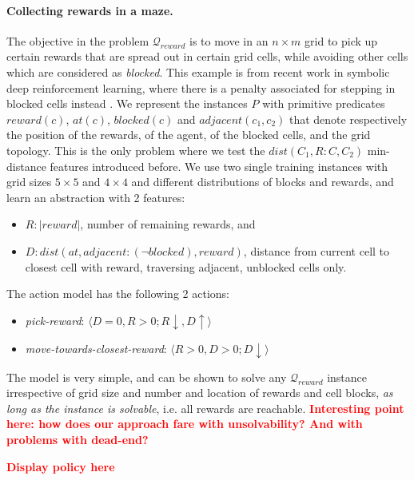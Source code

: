 \documentclass[letterpaper]{article} %
\newcommand{\tuple}[1]{\ensuremath{\langle #1 \rangle}}
\newcommand{\abs}[1]{\ensuremath{\left\vert{#1}\right\vert}}
\newcommand{\alert}[1]{\textcolor{red}{\bf #1}}
\newcommand{\Q}{\mathcal{Q}}
\begin{document}
\paragraph{Collecting rewards in a maze.}
The objective in the problem $\Q_{reward}$ is to move in an $n \times m$ grid to pick up certain
rewards that are spread out in certain grid cells, while avoiding other cells which are considered as \emph{blocked}.
This example is from recent work in symbolic deep
reinforcement learning, where there is a penalty associated for
stepping in blocked cells instead \cite{garnelo2016towards}.
%
We represent the instances $P$ with primitive predicates $reward(c)$, $at(c)$, $blocked(c)$ and $adjacent(c_1, c_2)$ that denote
respectively the position of the rewards, of the agent, of the blocked cells, and the grid topology.
This is the only problem where we test the $\textit{dist}(C_1,R:C,C_2)$ min-distance features introduced before.
We use two single training instances with grid sizes $5 \times 5$ and $4 \times 4$ and different distributions of blocks and rewards,
and learn an abstraction with 2 features:

\begin{itemize}
\item $R: \abs{reward}$, number of remaining rewards, and
\item $D: dist(at, adjacent:(\neg blocked), reward)$, distance from current cell to closest cell with reward, traversing adjacent, unblocked cells only.
\end{itemize}

\noindent The action model has the following 2 actions:

\begin{itemize}
\item \emph{pick-reward}: \hspace*{\fill} \tuple{D=0, R > 0;  R \downarrow, D \uparrow}
\item \emph{move-towards-closest-reward}: \hspace*{\fill} \tuple{R>0, D>0; D \downarrow}
\end{itemize}

The model is very simple, and can be shown to solve any $\Q_{reward}$ instance irrespective of 
grid size and number and location of rewards and cell blocks, \emph{as long as the instance is solvable},
i.e. all rewards are reachable.
\alert{Interesting point here: how does our approach fare with unsolvability? And with problems with dead-end?}


\alert{Display policy here}
\end{document}
